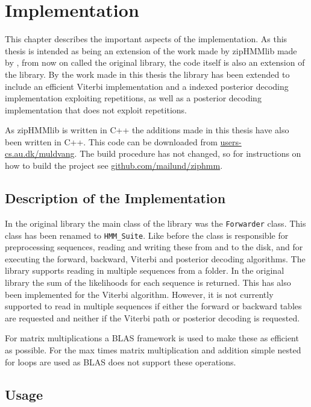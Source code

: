 
\chapter{Implementation}
\label{cha:implementation}

This chapter describes the important aspects of the implementation.  As this
thesis is intended as being an extension of the work made by zipHMMlib made by
\citet{sand2013ziphmmlib}, from now on called the original library, the code
itself is also an extension of the library.  By the work made in this thesis
the library has been extended to include an efficient Viterbi implementation
and a indexed posterior decoding implementation exploiting repetitions, as well
as a posterior decoding implementation that does not exploit repetitions.

As zipHMMlib is written in C++ the additions made in this thesis have also been
written in C++.  This code can be downloaded from
\url{users-cs.au.dk/muldvang}.   The build procedure has not
changed, so for instructions on how to build the project see
\url{github.com/mailund/ziphmm}.

\section{Description of the Implementation}

In the original library the main class of the library was the
\texttt{Forwarder} class.  This class has been renamed to \texttt{HMM\_Suite}.
Like before the class is responsible for preprocessing sequences, reading and
writing these from and to the disk, and for executing the forward, backward,
Viterbi and posterior decoding algorithms.  The library supports reading in
multiple sequences from a folder.  In the original library the sum of the
likelihoods for each sequence is returned.  This has also been implemented for
the Viterbi algorithm.  However, it is not currently supported to read in
multiple sequences if either the forward or backward tables are requested and
neither if the Viterbi path or posterior decoding is requested.

For matrix multiplications a BLAS framework is used to make these as efficient
as possible.  For the max times matrix multiplication and addition simple nested
for loops are used as BLAS does not support these operations.

\section{Usage}

